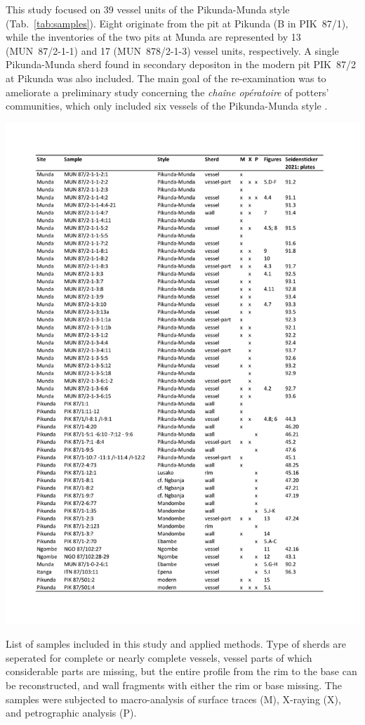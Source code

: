\documentclass[smallextended,natbib]{svjour3}       %
\begin{document}
This study focused on 39 vessel units of the Pikunda-Munda style (Tab.~\ref{tab:samples}). Eight originate from the pit at Pikunda (B in PIK~87/1), while the inventories of the two pits at Munda are represented by 13 (MUN~87/2-1-1) and 17 (MUN~878/2-1-3) vessel units, respectively. A single Pikunda-Munda sherd found in secondary depositon in the modern pit PIK~87/2 at Pikunda was also included. The main goal of the re-examination was to ameliorate a preliminary study concerning the \textit{chaîne opératoire} of potters' communities, which only included six vessels of the Pikunda-Munda style \citep[45--73]{Seidensticker.2021e}.

\begin{table}[p]
	\centering
	\includegraphics[height=.88\textheight]{Tab_Samples.pdf}
	\caption{List of samples included in this study and applied methods. Type of sherds are seperated for complete or nearly complete vessels, vessel parts of which considerable parts are missing, but the entire profile from the rim to the base can be reconstructed, and wall fragments with either the rim or base missing. The samples were subjected to macro-analysis of surface traces (M), X-raying (X), and petrographic analysis (P).}
	\label{tab:samples}	
\end{table}
\end{document}

